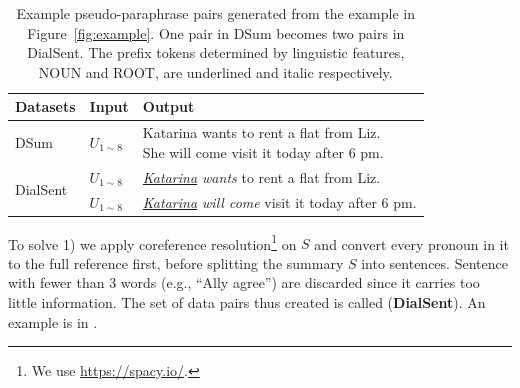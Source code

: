 \begin{table}[th]
	\scriptsize
	\centering
	\begin{tabular}{lll}
		\toprule[1pt]
		\textbf{Datasets} & \textbf{Input} & \textbf{Output} \\
		\midrule[1pt]
		{DSum} & $U_{1\sim8}$& \makecell[l]{Katarina wants to rent a flat from Liz.\\ She will come visit it today after 6 pm.}\\
		
		\midrule[1pt]
		\multirow{2}{1cm}{{DialSent}} & $U_{1\sim8}$ &\textit{\underline{Katarina} wants} to rent a flat from Liz. \\
		\cmidrule{2-3}
		&$U_{1\sim8}$ &\textit{\underline{Katarina} will come} visit it today after 6 pm. \\
		
		\bottomrule[1pt]
	\end{tabular}
	\caption{Example pseudo-paraphrase pairs generated from the example in Figure~\ref{fig:example}. One pair in DSum becomes two pairs in DialSent. The prefix tokens determined by linguistic features, NOUN and ROOT, are underlined and italic respectively.}
\label{tab:datasets}
\end{table}

To solve 1) we apply coreference resolution\footnote{We use \url{https://spacy.io/}.} on $S$ and convert every pronoun in it to the full reference 
first, before splitting the summary $S$ into sentences. 
Sentence with fewer than 3 words (e.g., ``Ally agree'') 
are discarded since it carries too little information.  
The set of data pairs thus created is called (\textbf{DialSent}). 
An example is in 
.

